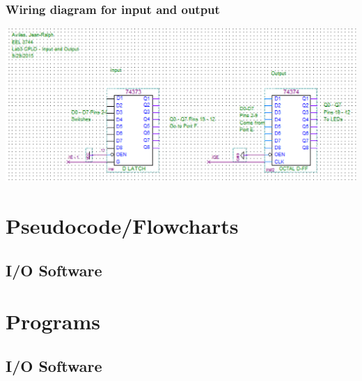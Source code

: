 \documentclass[letterpaper, 12pt]{article}
\begin{document}
\subsubsection*{Wiring diagram for input and output}
\includegraphics[width=1.0\textwidth,keepaspectratio=true]{IO}
\section*{Pseudocode/Flowcharts}
\subsection*{I/O Software}

\section*{Programs}
\subsection*{I/O Software}

\end{document}
